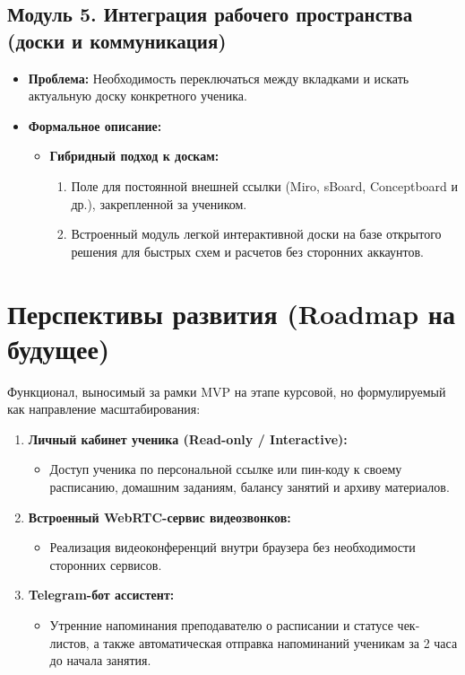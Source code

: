 \documentclass[12pt,a4paper]{article}
\begin{document}
\subsection{Модуль 5. Интеграция рабочего пространства (доски и коммуникация)}

\begin{itemize}
    \item \textbf{Проблема:} Необходимость переключаться между вкладками и искать актуальную доску конкретного ученика.
    \item \textbf{Формальное описание:}
    \begin{itemize}
        \item \textbf{Гибридный подход к доскам:}
        \begin{enumerate}
            \item Поле для постоянной внешней ссылки (Miro, sBoard, Conceptboard и др.), закрепленной за учеником.
            \item Встроенный модуль легкой интерактивной доски на базе открытого решения для быстрых схем и расчетов без сторонних аккаунтов.
        \end{enumerate}
    \end{itemize}
\end{itemize}

\section{Перспективы развития (Roadmap на будущее)}

Функционал, выносимый за рамки MVP на этапе курсовой, но формулируемый как направление масштабирования:

\begin{enumerate}
    \item \textbf{Личный кабинет ученика (Read-only / Interactive):}
    \begin{itemize}
        \item Доступ ученика по персональной ссылке или пин-коду к своему расписанию, домашним заданиям, балансу занятий и архиву материалов.
    \end{itemize}

    \item \textbf{Встроенный WebRTC-сервис видеозвонков:}
    \begin{itemize}
        \item Реализация видеоконференций внутри браузера без необходимости сторонних сервисов.
    \end{itemize}

    \item \textbf{Telegram-бот ассистент:}
    \begin{itemize}
        \item Утренние напоминания преподавателю о расписании и статусе чек-листов, а также автоматическая отправка напоминаний ученикам за 2 часа до начала занятия.
    \end{itemize}
\end{enumerate}
\end{document}
